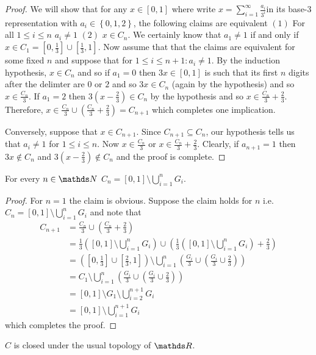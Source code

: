 \begin{proof}
We will show that for any $x\in\left[0,1\right]$ where write $x=\sum_{i=1}^{\infty}\frac{a_{i}}{3^{i}}$in
its base-$3$ representation with $a_{i}\in\left\{ 0,1,2\right\} $,
the following claims are equivalent $\left(1\right)$ For all $1\leq i\leq n$
$a_{i}\neq1$ $\left(2\right)$ $x\in C_{n}$. We certainly know that
$a_{1}\neq1$ if and only if $x\in C_{1}=\left[0,\frac{1}{3}\right]\cup\left[\frac{1}{3},1\right].$
Now assume that that the claims are equivalent for some fixed $n$
and suppose that for $1\leq i\leq n+1:a_{i}\neq1.$ By the induction
hypothesis, $x\in C_{n}$ and so if $a_{1}=0$ then $3x\in\left[0,1\right]$
is such that its first $n$ digits after the delimter are 0 or $2$
and so $3x\in C_{n}$ (again by the hypothesis) and so $x\in\frac{C_{n}}{3}.$
If $a_{1}=2$ then $3\left(x-\frac{2}{3}\right)\in C_{n}$ by the
hypothesis and so $x\in\frac{C_{n}}{3}+\frac{2}{3}$. Therefore, $x\in\frac{C_{n}}{3}\cup\left(\frac{C_{n}}{3}+\frac{2}{3}\right)=C_{n+1}$
which completes one implication.

Conversely, suppose that $x\in C_{n+1}$. Since $C_{n+1}\subseteq C_{n}$,
our hypothesis tells us that $a_{i}\neq1$ for $1\leq i\leq n$. Now
$x\in\frac{C_{n}}{3}$ or $x\in\frac{C_{n}}{3}+\frac{2}{3}$. Clearly,
if $a_{n+1}=1$ then $3x\notin C_{n}$ and $3\left(x-\frac{2}{3}\right)\notin C_{n}$
and the proof is complete.
\end{proof}
\begin{prop}
\label{prop:CantorSetEquiv}For every $n\in\N$ $C_{n}=\left[0,1\right]\setminus\bigcup_{i=1}^{n}G_{i}$.
\end{prop}

\begin{proof}
For $n=1$ the claim is obvious. Suppose the claim holds for $n$
i.e. $C_{n}=\left[0,1\right]\setminus\bigcup_{i=1}^{n}G_{i}$ and
note that 
\begin{align*}
C_{n+1} & =\frac{C_{n}}{3}\cup\left(\frac{C_{n}}{3}+\frac{2}{3}\right)\\
 & =\frac{1}{3}\left(\left[0,1\right]\setminus\bigcup_{i=1}^{n}G_{i}\right)\cup\left(\frac{1}{3}\left(\left[0,1\right]\setminus\bigcup_{i=1}^{n}G_{i}\right)+\frac{2}{3}\right)\\
 & =\left(\left[0,\frac{1}{3}\right]\cup\left[\frac{2}{3},1\right]\right)\setminus\bigcup_{i=1}^{n}\left(\frac{G_{i}}{3}\cup\left(\frac{G_{i}}{3}\cup\frac{2}{3}\right)\right)\\
 & =C_{1}\setminus\bigcup_{i=1}^{n}\left(\frac{G_{i}}{3}\cup\left(\frac{G_{i}}{3}\cup\frac{2}{3}\right)\right)\\
 & =\left[0,1\right]\setminus G_{1}\setminus\bigcup_{i=2}^{n+1}G_{i}\\
 & =\left[0,1\right]\setminus\bigcup_{i=1}^{n+1}G_{i}
\end{align*}
which completes the proof.
\end{proof}
\begin{prop}
\label{prop:cantorSetClosed}$C$ is closed under the usual topology
of $\R$.
\end{prop}

